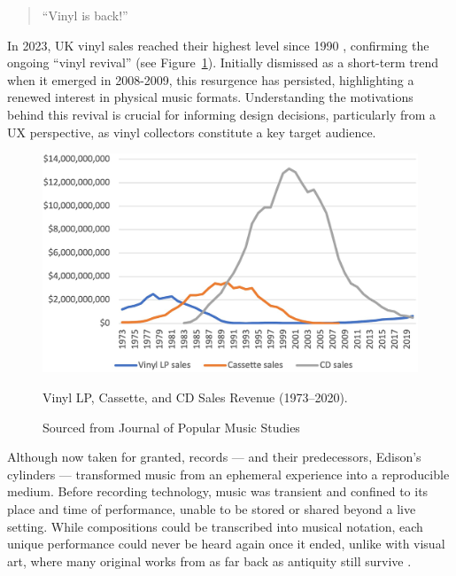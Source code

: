             \begin{quote}
                ``Vinyl is back!'' \cite{bechhofervttspec}
            \end{quote}
            
            In 2023, UK vinyl sales reached their highest level since 1990 \cite{geraghty2023uk_vinyl_sales}, confirming the ongoing ``vinyl revival'' \cite{vinylRevival} (see Figure~\ref{fig:vinyl_sales}). Initially dismissed as a short-term trend when it emerged in 2008-2009, this resurgence has persisted, highlighting a renewed interest in physical music formats. Understanding the motivations behind this revival is crucial for informing design decisions, particularly from a UX perspective, as vinyl collectors constitute a key target audience.
            
            \begin{figure}[htbp]
                \centering
                \includegraphics[width=\linewidth]{images/vinyl_sales_2023.png}
                \caption{Vinyl LP, Cassette, and CD Sales Revenue (1973–2020).}
                \caption*{Sourced from Journal of Popular Music Studies \cite{vinylRevival}}
                \label{fig:vinyl_sales}
            \end{figure}
    
            Although now taken for granted, records — and their predecessors, Edison's cylinders — transformed music from an ephemeral experience into a reproducible medium. Before recording technology, music was transient and confined to its place and time of performance, unable to be stored or shared beyond a live setting. While compositions could be transcribed into musical notation, each unique performance could never be heard again once it ended, unlike with visual art, where many original works from as far back as antiquity still survive \cite{jdbond}.
    
